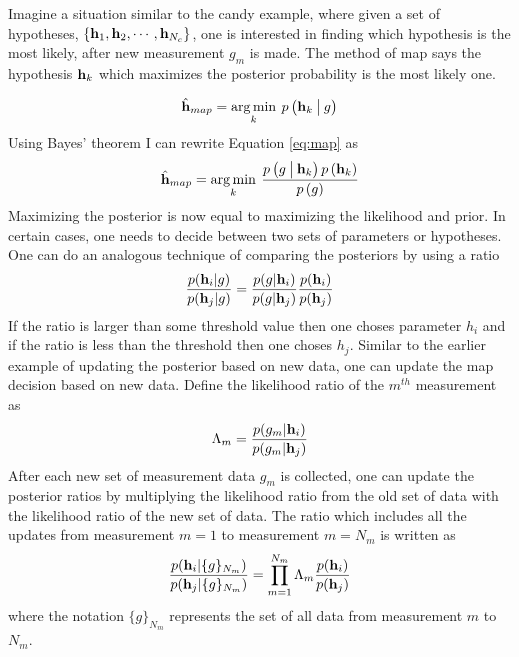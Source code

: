Imagine a situation similar to the candy example, where given a set of hypotheses, $ \{ \mb{h}_1, \mb{h}_2, \cdots, \mb{h}_{N_c} \}$, one is interested in finding which hypothesis is the most likely, after new measurement $g_m$ is made. The method of \acrfull{map} says the hypothesis $ \mb{h}_k $ which maximizes the posterior probability is the most likely one. 

\begin{equation}
	\mbh{h}_{map} = \argminA_{k} \: p\left( \mb{h}_k \given[\big] g \right) 
	\label{eq:map}
\end{equation} 
Using Bayes' theorem I can rewrite Equation \ref{eq:map} as 
\begin{equation}
	\mbh{h}_{map} = \argminA_{k} \: \frac{ p\left( g  \given[\big] \mb{h}_k \right) p\left( \mb{h}_k \right) } { p\left(  g \right) }
\end{equation} 
Maximizing the posterior is now equal to maximizing the likelihood and prior. In certain cases, one needs to decide between two sets of parameters or hypotheses. One can do an analogous technique of comparing the posteriors by using a ratio
%
\begin{equation}
	\frac{ p( \mb{h}_i | g ) }{ p( \mb{h}_j | g ) } = \frac{ p(g|\mb{h}_i) }{ p(g|\mb{h}_j)} \frac{p(\mb{h}_i)}{p(\mb{h}_j)}
\end{equation}
%
If the ratio is larger than some threshold value then one choses parameter $h_i$ and if the ratio is less than the threshold then one choses $h_j$. Similar to the earlier example of updating the posterior based on new data, one can update the \gls{map} decision based on new data. Define the likelihood ratio of the $m^{th}$ measurement as 
\begin{equation}
	\Lambda_m = \frac{ p(g_m|\mb{h}_i) }{ p(g_m|\mb{h}_j)}
\end{equation}
After each new set of measurement data $g_{m}$ is collected, one can update the posterior ratios by multiplying the likelihood ratio from the old set of data with the likelihood ratio of the new set of data. The ratio which includes all the updates from measurement $m = 1$ to measurement $m = N_m$ is written as
\begin{equation}
	\frac{ p( \mb{h}_i| \{ g \} _{N_m} ) }{ p( \mb{h}_j | \{ g \} _{N_m} ) } = \displaystyle\prod_{m=1}^{N_m} \Lambda_m \frac{p(\mb{h}_i)}{p(\mb{h}_j)}
\end{equation}
where the notation $\{ g \} _{N_m}$ represents the set of all data from measurement $m$ to $N_m$.

